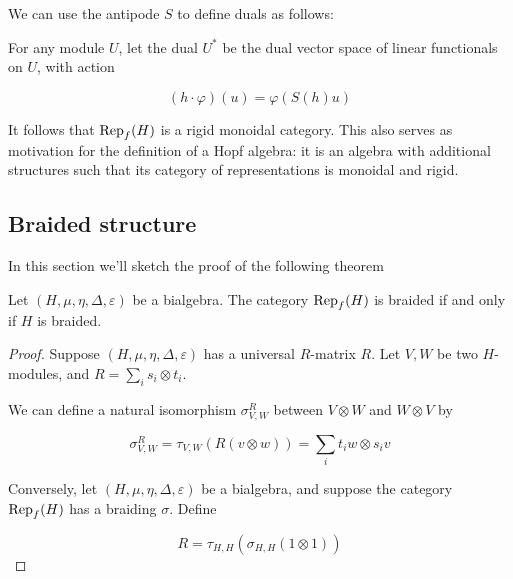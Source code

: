 We can use the antipode $S$ to define duals as follows:

For any module $U$, let the dual $U^*$ be the dual vector space of linear
functionals on $U$, with action

\begin{equation}
    (h\cdot \varphi)(u)  = \varphi(S(h) u)
\end{equation}

It follows that $\operatorname{Rep}_f(H)$ is a rigid monoidal category. This also serves as
motivation for the definition of a Hopf algebra: it is an algebra with
additional structures such that its category of representations is monoidal and
rigid. 


\subsection{Braided structure}
\label{bialgtocategory}
In this section we'll sketch the proof of the following theorem

\begin{theorem}
    Let $(H, \mu, \eta, \Delta, \varepsilon)$ be a bialgebra. The category $\operatorname{Rep}_f(H)$ is braided if and only if $H$ is braided. 
\end{theorem}
\begin{proof}
    Suppose $(H, \mu, \eta, \Delta, \varepsilon)$ has a universal $R$-matrix $R$. Let $V,W$ be two $H$-modules, and $R = \sum_{i} s_i \otimes t_i$. 

    We can define a natural isomorphism $\sigma_{V,W}^R$ between $V \otimes W$ and $W \otimes V$ by

    \begin{equation}
        \sigma_{V,W}^R = \tau_{V,W}(R(v \otimes w)) = \sum_{i} t_i w \otimes s_i v
    \end{equation}

    Conversely, let $(H, \mu, \eta, \Delta, \varepsilon)$ be a bialgebra, and suppose the category $\operatorname{Rep}_f(H)$ has a braiding $\sigma$. Define 

    \begin{equation}
        R = \tau_{H,H}(\sigma_{H,H}(1 \otimes 1))
    \end{equation}

\end{proof}


